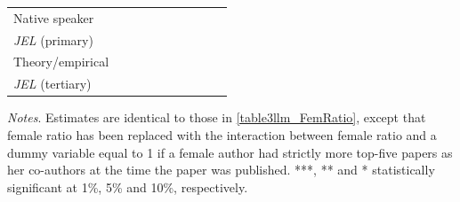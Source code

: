 \begin{table}
\begin{threeparttable}
\begin{tabular}{p{3cm}S@{}S@{}S@{}S@{}S@{}S@{}S@{}S@{}S@{}}
            Native speaker                &               &               &               &               &           {}   &           {}   &           {}   &           {}   &           {}   \\
            \textit{JEL} (primary)        &               &               &               &               &               &               &           {}   &               &               \\
            Theory/empirical              &               &               &               &               &               &               &               &           {}   &               \\
            \textit{JEL} (tertiary)       &               &               &               &               &               &               &               &               &           {}   \\
            \bottomrule
        \end{tabular}
        \begin{tablenotes}
            \tiny
            \item \textit{Notes}. Estimates are identical to those in \autoref{table3llm_FemRatio}, except that female ratio has been replaced with the interaction between female ratio and a dummy variable equal to 1 if a female author had strictly more top-five papers as her co-authors at the time the paper was published. ***, ** and * statistically significant at 1\%, 5\% and 10\%, respectively.
        \end{tablenotes}
    \end{threeparttable}
\end{table}